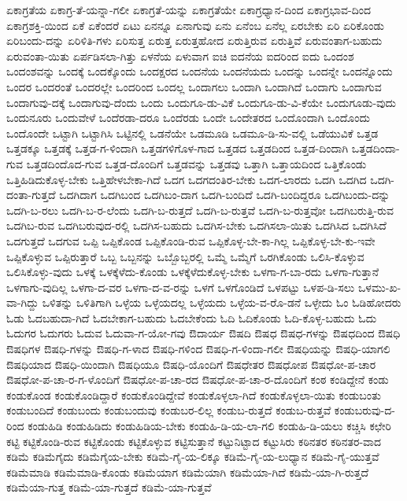 {ಏಕಾಗ್ರತೆಯ
ಏಕಾಗ್ರ-ತೆ-ಯನ್ನಾ-ಗಲೀ
ಏಕಾಗ್ರತೆ-ಯನ್ನು
ಏಕಾಗ್ರತೆಯೇ
ಏಕಾಗ್ರಧ್ಯಾನ-ದಿಂದ
ಏಕಾಗ್ರಭಾವ-ದಿಂದ
ಏಕಾಗ್ರಶಕ್ತಿ-ಯಿಂದ
ಏಕೆ
ಏಕೆಂದರೆ
ಏಟು
ಏನನ್ನೂ
ಏನಾಗುವು
ಏನು
ಏನೆಂಬ
ಏನೆಲ್ಲ
ಏರಬೇಕು
ಏರಿ
ಏರಿಕೊಂಡು
ಏರಿಬಂದು-ದನ್ನು
ಏರಿಳಿತಿ-ಗಳು
ಏರಿಸುತ್ತ
ಏರುತ್ತ
ಏರುತ್ತಹೋದ
ಏರುತ್ತಿರುವ
ಏರುತ್ತಿವೆ
ಏರುವಂತಾಗ-ಬಹುದು
ಏರುವಂತಾ-ಯಿತು
ಏರ್ಪಡಿಸಲಾ-ಗಿತ್ತು
ಏಳನೆಯ
ಏಳುವಾಗ
ಐಚಿ
ಐದನೆಯ
ಐದರಿಂದ
ಐದು
ಒಂದಂಶ
ಒಂದಂಶವನ್ನು
ಒಂದಕ್ಕೆ
ಒಂದಕ್ಕೊಂದು
ಒಂದಕ್ಷರದ
ಒಂದನೆಯ
ಒಂದನೆಯದು
ಒಂದನ್ನು
ಒಂದನ್ನೇ
ಒಂದನ್ನೊಂದು
ಒಂದರ
ಒಂದರಂತೆ
ಒಂದರಲ್ಲೇ
ಒಂದರಿಂದ
ಒಂದಲ್ಲ
ಒಂದಾಗಲು
ಒಂದಾಗಿ
ಒಂದಾಗಿದೆ
ಒಂದಾಗು
ಒಂದಾಗುವ
ಒಂದಾಗುವು-ದಕ್ಕೆ
ಒಂದಾಗುವು-ದೆಂದು
ಒಂದು
ಒಂದುಗೂ-ಡು-ವಿಕೆ
ಒಂದುಗೂ-ಡು-ವಿ-ಕೆಯೇ
ಒಂದುಗೂಡು-ವುದು
ಒಂದುನೂರು
ಒಂದುವೇಳೆ
ಒಂದೆರಡಾ-ದರೂ
ಒಂದೆರಡು
ಒಂದೇ
ಒಂದೇತರದ
ಒಂದೊಂದಾಗಿ
ಒಂದೊಂದು
ಒಂದೊಂದೇ
ಒಟ್ಟಾಗಿ
ಒಟ್ಟಾಗಿಸಿ
ಒಟ್ಟಿನಲ್ಲಿ
ಒಡನೆಯೇ
ಒಡಮೂಡಿ
ಒಡಮೂ-ಡಿ-ಸು-ವಲ್ಲಿ
ಒಡೆಯುವಿಕೆ
ಒತ್ತಡ
ಒತ್ತಡಕ್ಕೂ
ಒತ್ತಡಕ್ಕೆ
ಒತ್ತಡ-ಗ-ಳಿಂದಾಗಿ
ಒತ್ತಡಗಳಿಗೊಳ-ಗಾದ
ಒತ್ತಡದ
ಒತ್ತಡದಿಂದ
ಒತ್ತಡ-ದಿಂದಾಗಿ
ಒತ್ತಡದಿಂದಾ-ಗುವ
ಒತ್ತಡದಿಂದೊದ-ಗುವ
ಒತ್ತಡ-ದೊಂದಿಗೆ
ಒತ್ತಡವನ್ನು
ಒತ್ತಡವು
ಒತ್ತಾಗಿ
ಒತ್ತಾಯದಿಂದ
ಒತ್ತಿಕೊಂಡು
ಒತ್ತಿಹಿಡಿದುಕೊಳ್ಳ-ಬೇಕು
ಒತ್ತಿಹೇಳಬೇಕಾ-ಗಿದೆ
ಒದಗ
ಒದಗದಂತಿರ-ಬೇಕು
ಒದಗ-ಲಾರದು
ಒದಗಿ
ಒದಗಿದ
ಒದಗಿ-ದಂತಾ-ಗುತ್ತದೆ
ಒದಗಿದಾಗ
ಒದಗಿಬಂದ
ಒದಗಿಬಂ-ದಾಗ
ಒದಗಿ-ಬಂದಿದೆ
ಒದಗಿ-ಬಂದಿದ್ದರೂ
ಒದಗಿಬಂದು-ದನ್ನು
ಒದಗಿ-ಬ-ರಲು
ಒದಗಿ-ಬ-ರ-ಲೆಂದು
ಒದಗಿ-ಬ-ರುತ್ತದೆ
ಒದಗಿ-ಬ-ರುತ್ತವೆ
ಒದಗಿ-ಬ-ರುತ್ತವೋ
ಒದಗಿಬರುತ್ತಿ-ರುವ
ಒದಗಿಬ-ರುವ
ಒದಗಿಬರುವುದ-ರಲ್ಲಿ
ಒದಗಿಸ-ಬಹುದು
ಒದಗಿಸ-ಬೇಕು
ಒದಗಿಸಲಾ-ಯಿತು
ಒದಗಿಸಿದ
ಒದಗಿಸಿದೆ
ಒದಗುತ್ತದೆ
ಒದಗುವ
ಒಪ್ಪಿ
ಒಪ್ಪಿಕೊಂಡ
ಒಪ್ಪಿಕೊಂಡಿ-ರುವ
ಒಪ್ಪಿಕೊಳ್ಳ-ಬೇ-ಕಾ-ಗಿಲ್ಲ
ಒಪ್ಪಿಕೊಳ್ಳ-ಬೇ-ಕು-ಇವೇ
ಒಪ್ಪಿಕೊಳ್ಳುವ
ಒಪ್ಪಿರುತ್ತಾರೆ
ಒಬ್ಬ
ಒಬ್ಬನನ್ನು
ಒಬ್ಬೊಬ್ಬರಲ್ಲಿ
ಒಮ್ಮೆ
ಒಮ್ಮೆಗೆ
ಒರಗಿಕೊಂಡು
ಒಲಿಸಿ-ಕೊಳ್ಳುವ
ಒಲಿಸಿಕೊಳ್ಳು-ವುದು
ಒಳಕ್ಕೆ
ಒಳಕ್ಕೆಳೆದು-ಕೊಂಡು
ಒಳಕ್ಕೆಳೆದುಕೊಳ್ಳ-ಬೇಕು
ಒಳಗಾ-ಗ-ಬಾ-ರದು
ಒಳಗಾ-ಗುತ್ತಾನೆ
ಒಳಗಾಗು-ವುದಿಲ್ಲ
ಒಳಗಾ-ದ-ವರ
ಒಳಗಾ-ದ-ವ-ರನ್ನು
ಒಳಗೆ
ಒಳಗೊಂಡಿದೆ
ಒಳಪಟ್ಟು
ಒಳಪ-ಡಿ-ಸಲು
ಒಳಮು-ಖ-ವಾ-ಗಿದ್ದು
ಒಳಿತನ್ನು
ಒಳಿತಿಗಾಗಿ
ಒಳ್ಳೆಯ
ಒಳ್ಳೆಯದಲ್ಲ
ಒಳ್ಳೆಯದು
ಒಳ್ಳೆಯ-ವ-ರೊ-ಡನೆ
ಒಳ್ಳೇದು
ಓಂ
ಓಡಿಹೋದರು
ಓಡು
ಓದಬಹುದಾ-ಗಿದೆ
ಓದಬೇಕಾಗ-ಬಹುದು
ಓದಬೇಕೆಂದು
ಓದಿ
ಓದಿಕೊಂಡು
ಓದಿ-ಕೊಳ್ಳ-ಬಹುದು
ಓದು
ಓದುಗರ
ಓದುಗರು
ಓದುವ
ಓದುವಾ-ಗ-ಯೋ-ಗವು
ಔದಾರ್ಯ
ಔಷದಿ
ಔಷಧ
ಔಷಧ-ಗಳನ್ನು
ಔಷಧದಿಂದ
ಔಷಧಿ
ಔಷಧಿಗಳ
ಔಷಧಿ-ಗಳನ್ನು
ಔಷಧಿ-ಗ-ಳಾದ
ಔಷಧಿ-ಗಳಿಂದ
ಔಷಧಿ-ಗ-ಳಿಂದಾ-ಗಲೀ
ಔಷಧಿಯನ್ನು
ಔಷಧಿ-ಯಾಗಲಿ
ಔಷಧಿಯಾದ
ಔಷಧಿ-ಯಿಂದಾಗಿ
ಔಷಧಿಯೂ
ಔಷಧಿ-ಯೊಂದಿಗೆ
ಔಷಧೇತರ
ಔಷಧೋಪ
ಔಷಧೋ-ಪ-ಚಾರ
ಔಷಧೋ-ಪ-ಚಾ-ರ-ಗ-ಳೊಂದಿಗೆ
ಔಷಧೋ-ಪ-ಚಾ-ರದ
ಔಷಧೋ-ಪ-ಚಾ-ರ-ದೊಂದಿಗೆ
ಕಂಠ
ಕಂಡಿದ್ದೇನೆ
ಕಂಡು
ಕಂಡುಕೊಂಡ
ಕಂಡುಕೊಂಡಿದ್ದಾರೆ
ಕಂಡುಕೊಂಡಿದ್ದೇವೆ
ಕಂಡುಕೊಳ್ಳಲಾ-ಗಿದೆ
ಕಂಡುಕೊಳ್ಳಲಾ-ಯಿತು
ಕಂಡುಬಂತು
ಕಂಡುಬಂದಿದೆ
ಕಂಡುಬಂದು
ಕಂಡುಬಂದುವು
ಕಂಡುಬರ-ಲಿಲ್ಲ
ಕಂಡುಬ-ರುತ್ತದೆ
ಕಂಡುಬ-ರುತ್ತವೆ
ಕಂಡುಬರುವು-ದ-ರಿಂದ
ಕಂಡುಹಿಡಿ
ಕಂಡುಹಿಡಿದು
ಕಂಡುಹಿಡಿಯ-ಬೇಕು
ಕಂಡುಹಿ-ಡಿ-ಯ-ಲಾ-ಗಲಿ
ಕಂಡುಹಿ-ಡಿ-ಯಲು
ಕಚ್ಚಿಸಿ
ಕಛೇರಿ
ಕಟ್ಟಿ
ಕಟ್ಟಿಕೊಂಡಿ-ರುವ
ಕಟ್ಟಿಕೊಂಡು
ಕಟ್ಟಿಕೊಳ್ಳುವ
ಕಟ್ಟಿಸುತ್ತಾನೆ
ಕಟ್ಟುನಿಟ್ಟಾದ
ಕಟ್ಟುಸಿರು
ಕಠಿನತರ
ಕಠಿನತರ-ವಾದ
ಕಡಿಮೆ
ಕಡಿಮೆಗೈದು
ಕಡಿಮೆಗೈಯ-ಬೇಕು
ಕಡಿಮೆ-ಗೈ-ಯ-ಲಿಕ್ಕೂ
ಕಡಿಮೆ-ಗೈ-ಯ-ಲುಧ್ಯಾನ
ಕಡಿಮೆ-ಗೈ-ಯುತ್ತವೆ
ಕಡಿಮೆಮಾಡಿ
ಕಡಿಮೆಮಾಡಿ-ಕೊಂಡು
ಕಡಿಮೆಯಾಗ
ಕಡಿಮೆಯಾಗಿ
ಕಡಿಮೆಯಾ-ಗಿದೆ
ಕಡಿಮೆ-ಯಾ-ಗಿ-ರುತ್ತದೆ
ಕಡಿಮೆಯಾ-ಗುತ್ತ
ಕಡಿಮೆ-ಯಾ-ಗುತ್ತದೆ
ಕಡಿಮೆ-ಯಾ-ಗುತ್ತವೆ
}
